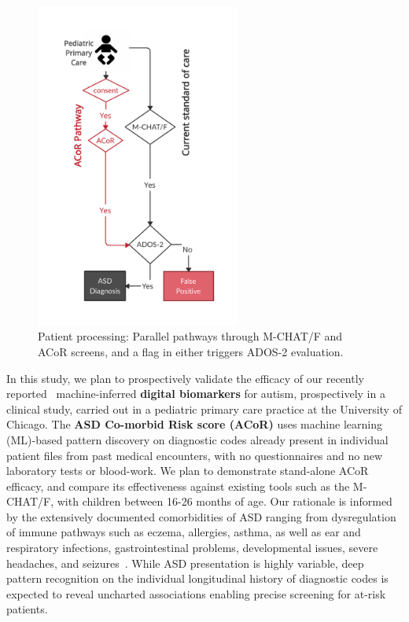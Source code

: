 \documentclass[onecolumn, compsoc,11pt]{IEEEtran}
\renewcommand{\captionN}[1]{\caption{\color{CadetBlue4!80!black} \sffamily \fontsize{9}{10}\selectfont #1  }}
\def\acor{ACoR\xspace}
\begin{document}
\begin{figure}
  \vspace{-40pt}
  
  \hspace{-25pt}\includegraphics[width=2.65in]{Figures/flowx}
  \vspace{-45pt}
  
  \captionN{Patient processing: Parallel pathways through M-CHAT/F and \acor screens, and
  a flag in either triggers ADOS-2 evaluation.}\label{figflow}
\end{figure}%
%
In this study, we plan to prospectively validate the efficacy of our recently reported~\cite{Onishchenko_2021}  machine-inferred \textbf{digital biomarkers} for autism, prospectively in a  clinical study, carried out in a
pediatric primary care practice at the University of Chicago. The \textbf{ ASD Co-morbid Risk score (\acor)} uses machine learning (ML)-based pattern discovery on diagnostic codes already present in individual patient files from past medical encounters, with no questionnaires and no new laboratory tests or blood-work. We plan to demonstrate stand-alone \acor efficacy, and compare its effectiveness against existing  tools such as the M-CHAT/F, with children between 16-26 months of age. Our rationale is informed by the extensively documented comorbidities of ASD ranging from dysregulation of immune pathways such as eczema, allergies, asthma, as well as ear and respiratory infections, gastrointestinal problems, developmental issues, severe headaches, and seizures~\cite{pmid30733689,pmid22511918}. While ASD presentation is highly variable, deep pattern recognition on the individual longitudinal history of  diagnostic codes is expected to reveal uncharted associations enabling precise screening for at-risk patients.
\end{document}
